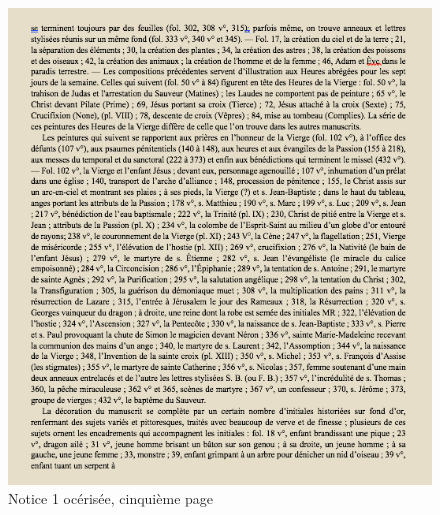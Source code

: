 \documentclass[a4paper,12pt,twoside]{book}
\begin{document}
    \begin{figure}[!h]
    \centering
    \includegraphics[width=15cm]{img/Notices_Leroquais/Notice1/OCR/notice_OCR_1_5.png}
    \caption{Notice 1 océrisée, cinquième page}
    \end{figure}
    \clearpage
    
\end{document}
